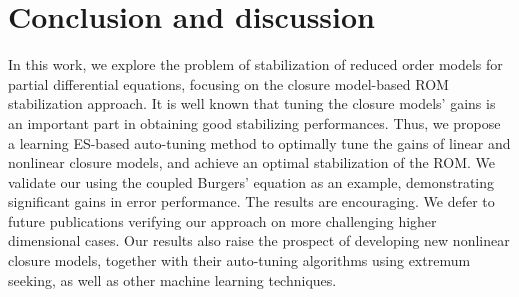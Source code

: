 \documentclass[letterpaper,conference,onecolumn,11pt]{IEEEtran}
\begin{document}
\newpage
\section{Conclusion and discussion}\label{concl}
In this work, we explore the problem of stabilization of reduced order
models for partial differential equations, focusing on the closure
model-based ROM stabilization approach. It is well known that tuning
the closure models' gains is an important part in obtaining good
stabilizing performances.  Thus, we propose a learning ES-based
auto-tuning method to optimally tune the gains of linear and nonlinear
closure models, and achieve an optimal stabilization of the ROM. We
validate our using the coupled Burgers' equation as an example,
demonstrating significant gains in error performance. The results are
encouraging. We defer to future publications verifying our approach on
more challenging higher dimensional cases. Our results also raise the
prospect of developing new nonlinear closure models, together with
their auto-tuning algorithms using extremum seeking, as well as other
machine learning techniques.


\footnotesize{}
\end{document}
